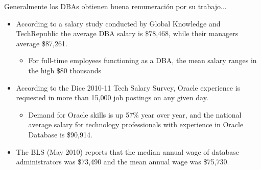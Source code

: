 \documentclass{beamer}
\begin{document}
\begin{frame}{Generalmente los DBAs obtienen buena remuneración por su trabajo...}
    \begin{itemize}
        \item According to a salary study conducted by Global Knowledge and TechRepublic the average DBA salary is \$78,468, while their managers average \$87,261. 
        \begin{itemize}
            \item For full-time employees functioning as a DBA, the mean salary ranges in the high \$80 thousands
        \end{itemize}

        \item According to the Dice 2010-11 Tech Salary Survey, Oracle experience is requested in more than 15,000 job postings on any given day. 
        \begin{itemize}
            \item Demand for Oracle skills is up 57\% year over year, and the national average salary for technology professionals with experience in Oracle Database is \$90,914. 
        \end{itemize}

        \item The BLS (May 2010) reports that the median annual wage of database administrators was \$73,490 and the mean annual wage was \$75,730. 
    \end{itemize}
\end{frame}
\end{document}
